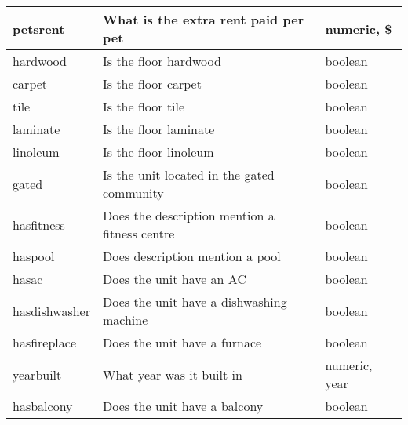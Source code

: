 \documentclass[12pt]{report}
\begin{document}
\begin{longtable}{|p{4cm}|p{8.7cm}|p{2.5cm}|}
	pets\textunderscore rent                              & What is the extra rent paid per pet                                 & numeric, \$      \\ \hline
	hardwood                                              & Is the floor hardwood                                               & boolean          \\ \hline
	carpet                                                & Is the floor carpet                                                 & boolean          \\ \hline
	tile                                                  & Is the floor tile                                                   & boolean          \\ \hline
	laminate                                              & Is the floor laminate                                               & boolean          \\ \hline
	linoleum                                              & Is the floor linoleum                                               & boolean          \\ \hline
	gated                                                 & Is the unit located in the gated community                          & boolean          \\ \hline
	hasfitness                                            & Does the description mention a fitness centre                       & boolean          \\ \hline
	haspool                                               & Does description mention a pool                                     & boolean          \\ \hline
	hasac                                                 & Does the unit have an AC                                            & boolean          \\ \hline
	hasdishwasher                                         & Does the unit have a dishwashing machine                            & boolean          \\ \hline
	hasfireplace                                          & Does the unit have a furnace                                        & boolean          \\ \hline
	year\textunderscore built                             & What year was it built in                                           & numeric, year    \\ \hline
	hasbalcony                                            & Does the unit have a balcony                                        & boolean          \\ \hline

\end{longtable}
\end{document}
